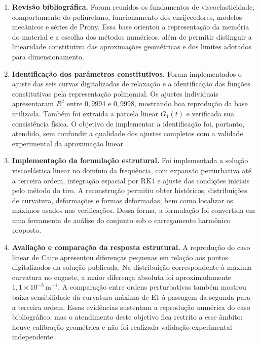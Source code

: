 \documentclass[arial,centeredequations,english,brazilian,oneside,section=TITLE]{ifes8}
\begin{document}
\begin{enumerate}
  \item \textbf{Revisão bibliográfica.} Foram reunidos os fundamentos de
  viscoelasticidade, comportamento do poliuretano, funcionamento dos
  enrijecedores, modelos mecânicos e séries de Prony. Essa base orientou
  a representação da memória do material e a escolha dos métodos
  numéricos, além de permitir distinguir a linearidade constitutiva das
  aproximações geométricas e dos limites adotados para dimensionamento.

  \item \textbf{Identificação dos parâmetros constitutivos.} Foram
  implementados o ajuste das seis curvas digitalizadas de relaxação e
  a identificação das funções constitutivas pela representação
  polinomial. Os ajustes individuais apresentaram $R^2$ entre
  $0{,}9994$ e $0{,}9998$, mostrando boa reprodução da base utilizada.
  Também foi extraída a parcela linear $G_1(t)$ e verificada sua
  consistência física. O objetivo de implementar a identificação foi,
  portanto, atendido, sem confundir a qualidade dos ajustes completos
  com a validade experimental da aproximação linear.

  \item \textbf{Implementação da formulação estrutural.} Foi implementada
  a solução viscoelástica linear no domínio da frequência, com expansão
  perturbativa até a terceira ordem, integração espacial por RK4 e
  ajuste das condições iniciais pelo método do tiro. A reconstrução
  permitiu obter históricos, distribuições de curvatura, deformações e
  formas deformadas, bem como localizar os máximos usados nas
  verificações. Dessa forma, a formulação foi convertida em uma
  ferramenta de análise do conjunto sob o carregamento harmônico
  proposto.

  \item \textbf{Avaliação e comparação da resposta estrutural.} A
  reprodução do caso linear de Caire apresentou diferenças pequenas
  em relação aos pontos digitalizados da solução publicada. Na
  distribuição correspondente à máxima curvatura no engaste, a maior
  diferença absoluta foi aproximadamente
  $1{,}1\times10^{-3}\,\mathrm{m^{-1}}$. A comparação entre ordens
  perturbativas também mostrou baixa sensibilidade da curvatura máxima
  de E1 à passagem da segunda para a terceira ordem. Essas evidências
  sustentam a reprodução numérica do caso bibliográfico, mas o
  atendimento deste objetivo fica restrito a esse âmbito: houve
  calibração geométrica e não foi realizada validação experimental
  independente.


\end{enumerate}
\end{document}
